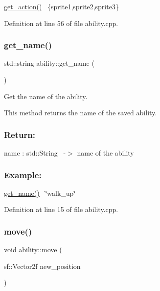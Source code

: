 \hyperlink{classability_adeb10a7af2d372637d56395792ac918f}{get\+\_\+action()}~\newline
\{sprite1,sprite2,sprite3\} 

Definition at line 56 of file ability.\+cpp.

\mbox{\label{classability_a83c4b418a33a2a7f44c3883abfeac4fb}} 
\subsubsection{\texorpdfstring{get\+\_\+name()}{get\_name()}}
{\footnotesize\ttfamily std\+::string ability\+::get\+\_\+name (\begin{DoxyParamCaption}{ }\end{DoxyParamCaption})}



Get the name of the ability. 

This method returns the name of the saved ability.~\newline


\subsubsection*{Return\+: }

name \+: std\+::\+String~\newline
-\/$>$ name of the ability

\subsubsection*{Example\+: }

\hyperlink{classability_a83c4b418a33a2a7f44c3883abfeac4fb}{get\+\_\+name()}~\newline
\char`\"{}walk\+\_\+up\char`\"{}~\newline


Definition at line 15 of file ability.\+cpp.

\mbox{\label{classability_ae34dc7ddb4b0fdb1b00e70ce1860456e}} 
\subsubsection{\texorpdfstring{move()}{move()}}
{\footnotesize\ttfamily void ability\+::move (\begin{DoxyParamCaption}\item[{sf\+::\+Vector2f}]{new\+\_\+position }\end{DoxyParamCaption})}



